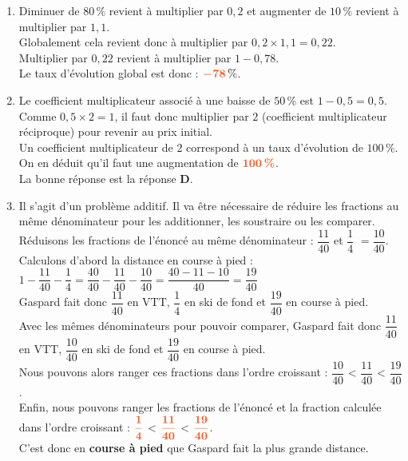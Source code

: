 \documentclass[a4paper,11pt]{article}
\newcounter{seancenum}
\newcounter{seancenumD}
\begin{document}
\setcounter{seancenumD}{9}
\newpage
\begin{seanceD}{} %
\begin{enumerate}
\item Diminuer de $80\,\%$ revient à multiplier par $0{,}2$ et augmenter de $10\,\%$ revient à multiplier par $1{,}1$.\\
  Globalement cela revient donc à multiplier par $0{,}2\times 1{,}1=0{,}22$.\\
  Multiplier par $0{,}22$ revient à multiplier par  $1-0{,}78$. \\
          Le taux d'évolution global est donc : ${\color[HTML]{f15929}\boldsymbol{-78\,}} \%$.
          
\item  Le coefficient multiplicateur associé à une baisse de $50\,\%$ est $1-0{,}5=0{,}5$.\\
    Comme $0{,}5\times 2=1$, il faut donc multiplier par $2$ (coefficient multiplicateur réciproque) pour revenir au prix initial.\\
      Un coefficient multiplicateur de $2$ correspond à un taux d'évolution de $100\,\%$.\\
      On en déduit qu'il faut une augmentation de ${\color[HTML]{f15929}\boldsymbol{100\,\%}}$.\\La bonne réponse est la réponse {\bfseries \color[HTML]{f15929}D}.


\item Il s'agit d'un problème additif. Il va être nécessaire de réduire les fractions au même dénominateur pour les additionner, les soustraire ou les comparer.\\Réduisons les fractions de l'énoncé au même dénominateur :  $\dfrac{11}{40}$  et $\dfrac{1}{4}$ $= \dfrac{10}{40}$.\\Calculons d'abord la distance en course à pied : \\$1-\dfrac{11}{40}-\dfrac{1}{4} = \dfrac{40}{40}-\dfrac{11}{40}-\dfrac{10}{40} = \dfrac{40-11-10}{40} = \dfrac{19}{40}$\\Gaspard fait donc $\dfrac{11}{40}$ en VTT, $\dfrac{1}{4}$ en ski de fond et $\dfrac{19}{40}$ en course à pied.\\ Avec les mêmes dénominateurs pour pouvoir comparer, Gaspard fait donc $\dfrac{11}{40}$ en VTT, $\dfrac{10}{40}$ en ski de fond et $\dfrac{19}{40}$ en course à pied.\\Nous pouvons alors ranger ces fractions dans l'ordre croissant : $\dfrac{10}{40}$ < $\dfrac{11}{40}$ < $\dfrac{19}{40}$.\\Enfin, nous pouvons ranger les fractions de l'énoncé et la fraction calculée dans l'ordre croissant : ${\color[HTML]{f15929}\boldsymbol{\dfrac{1}{4}}}$ < ${\color[HTML]{f15929}\boldsymbol{\dfrac{11}{40}}}$ < ${\color[HTML]{f15929}\boldsymbol{\dfrac{19}{40}}}$.\\ 
                      C'est donc en {\bfseries \color[HTML]{f15929}course à pied} que Gaspard fait la plus grande distance.


\end{enumerate}
\end{seanceD}
\end{document}

